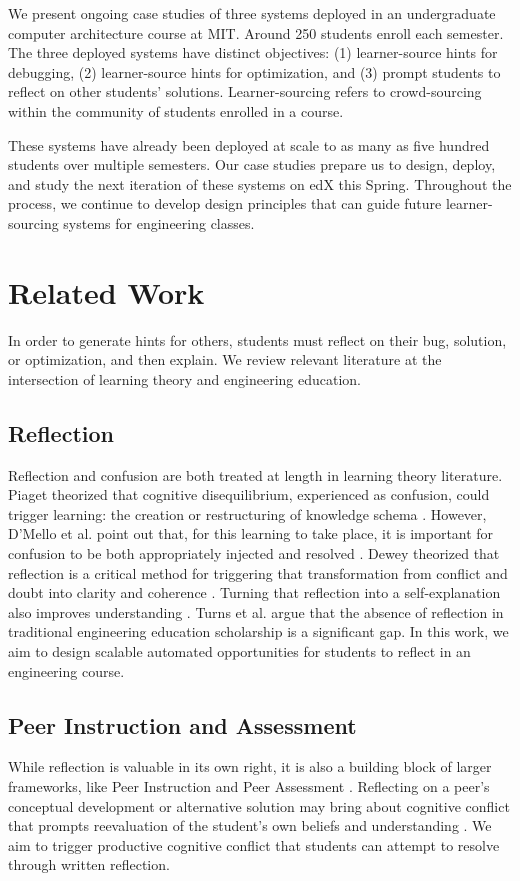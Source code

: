 \documentclass{chi-ext}
\begin{document}
We present ongoing case studies of three systems deployed in an undergraduate computer architecture course at MIT. Around 250 students enroll each semester. The three deployed systems have distinct objectives: (1) learner-source hints for debugging, (2) learner-source hints for optimization, and (3) prompt students to reflect on other students' solutions. Learner-sourcing refers to crowd-sourcing within the community of students enrolled in a course.

These systems have already been deployed at scale to as many as five hundred students over multiple semesters. Our case studies prepare us to design, deploy, and study the next iteration of these systems on edX this Spring. Throughout the process, we continue to develop design principles that can guide future learner-sourcing systems for engineering classes.

\section{Related Work}

In order to generate hints for others, students must reflect on their bug, solution, or optimization, and then explain. We review relevant literature at the intersection of learning theory and engineering education.

\subsection{Reflection}
Reflection and confusion are both treated at length in learning theory literature. Piaget theorized that cognitive disequilibrium, experienced as confusion, could trigger learning: the creation or restructuring of knowledge schema \cite{disequilibrium}. However, D'Mello et al. point out that, for this learning to take place, it is important for confusion to be both appropriately injected and resolved \cite{productiveconfusion}. Dewey theorized that reflection is a critical method for triggering that transformation from conflict and doubt into clarity and coherence \cite{dewey1933}. Turning that reflection into a self-explanation also improves understanding \cite{selfexplanation}. Turns et al. \cite{asee} argue that the absence of reflection in traditional engineering education scholarship is a significant gap. In this work, we aim to design scalable automated opportunities for students to reflect in an engineering course.
\subsection{Peer Instruction and Assessment}
While reflection is valuable in its own right, it is also a building block of larger frameworks, like Peer Instruction \cite{mazur} and Peer Assessment \cite{peerassessment}. Reflecting on a peer's conceptual development or alternative solution may bring about cognitive conflict that prompts reevaluation of the student's own beliefs and understanding \cite{kavanagh}. We aim to trigger productive cognitive conflict that students can attempt to resolve through written reflection.
\end{document}
